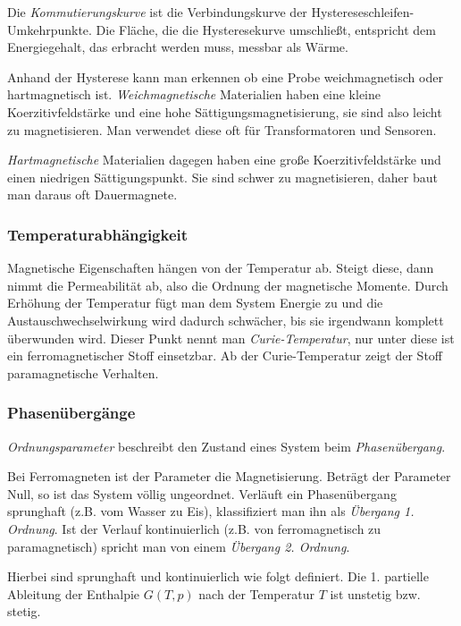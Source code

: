 \documentclass[12pt,a4paper]{scrartcl}
\numberwithin{equation}{section} %
\renewcommand{\[}{} %
\renewcommand{\]}{\noindent} %
\begin{document}
Die \emph{Kommutierungskurve} ist die Verbindungskurve der
Hystereseschleifen-Umkehrpunkte. Die Fläche, die die Hysteresekurve
umschließt, entspricht dem Energiegehalt, das erbracht werden muss,
messbar als Wärme.

Anhand der Hysterese kann man erkennen ob eine Probe weichmagnetisch
oder hartmagnetisch ist. \emph{Weichmagnetische} Materialien haben eine
kleine Koerzitivfeldstärke und eine hohe Sättigungsmagnetisierung, sie
sind also leicht zu magnetisieren. Man verwendet diese oft für
Transformatoren und Sensoren.

\emph{Hartmagnetische} Materialien dagegen haben eine große
Koerzitivfeldstärke und einen niedrigen Sättigungspunkt. Sie sind schwer
zu magnetisieren, daher baut man daraus oft Dauermagnete.

\hypertarget{temperaturabhuxe4ngigkeit}{%
\subsubsection{Temperaturabhängigkeit}\label{temperaturabhuxe4ngigkeit}}

Magnetische Eigenschaften hängen von der Temperatur ab. Steigt diese,
dann nimmt die Permeabilität ab, also die Ordnung der magnetische
Momente. Durch Erhöhung der Temperatur fügt man dem System Energie zu
und die Austauschwechselwirkung wird dadurch schwächer, bis sie
irgendwann komplett überwunden wird. Dieser Punkt nennt man
\emph{Curie-Temperatur}, nur unter diese ist ein ferromagnetischer Stoff
einsetzbar. Ab der Curie-Temperatur zeigt der Stoff paramagnetische
Verhalten.

\hypertarget{phasenuxfcberguxe4nge}{%
\subsubsection{Phasenübergänge}\label{phasenuxfcberguxe4nge}}

\emph{Ordnungsparameter} beschreibt den Zustand eines System beim
\emph{Phasenübergang}.

Bei Ferromagneten ist der Parameter die Magnetisierung. Beträgt der
Parameter Null, so ist das System völlig ungeordnet. Verläuft ein
Phasenübergang sprunghaft (z.B. vom Wasser zu Eis), klassifiziert man
ihn als \emph{Übergang 1. Ordnung}. Ist der Verlauf kontinuierlich (z.B.
von ferromagnetisch zu paramagnetisch) spricht man von einem
\emph{Übergang 2. Ordnung}.

Hierbei sind sprunghaft und kontinuierlich wie folgt definiert. Die 1.
partielle Ableitung der Enthalpie \(G(T,p)\) nach der Temperatur \(T\)
ist unstetig bzw. stetig.
\end{document}
